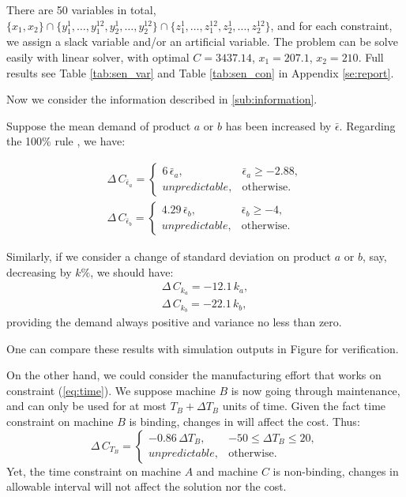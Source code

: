 \documentclass[a4paper,11pt]{article}
\begin{document}
There are 50 variables in total, $\big\{ x_1,x_2 \big\} \cap \big\{ y_1^1,\dots,y_1^{12},y_2^1,\dots,y_2^{12} \big\} \cap \big\{ z_1^1,\dots,z_1^{12},z_2^1,\dots,z_2^{12} \big\}$, and for each constraint, we assign a slack variable and/or an artificial variable. The problem can be solve easily with linear solver, with optimal $C=3437.14$, $x_1=207.1$, $x_2=210$. Full results see Table \ref{tab:sen_var} and Table \ref{tab:sen_con} in Appendix \ref{se:report}.

Now we consider the information described in \ref{sub:information}.

Suppose the mean demand of product $a$ or $b$ has been increased by $\bar{\epsilon}$. Regarding the 100\% rule \cite{BHM77}, we have:

\[
\begin{aligned}
    \Delta \, C_{\bar{\epsilon}_a} = 
    \begin{cases}
        6 \, \bar{\epsilon}_a, & \bar{\epsilon}_a \geq -2.88,\\
        unpredictable, & \text{otherwise}.
    \end{cases}\\
    \Delta \, C_{\bar{\epsilon}_b} = 
    \begin{cases}
        4.29 \, \bar{\epsilon}_b, & \bar{\epsilon}_b \geq -4,\\
        unpredictable, & \text{otherwise}.
    \end{cases}
\end{aligned}
\]

Similarly, if we consider a change of standard deviation on product $a$ or $b$, say, decreasing by $k\%$, we should have:
\[
\begin{aligned}
    \Delta \, C_{k_a} = -12.1 \, k_a,\\
    \Delta \, C_{k_b} = -22.1 \, k_b,
\end{aligned}
\]
providing the demand always positive and variance no less than zero.

One can compare these results with simulation outputs in Figure for verification.

On the other hand, we could consider the manufacturing effort that works on constraint (\ref{eq:time}). We suppose machine $B$ is now going through maintenance, and can only be used for at most $T_B + \Delta T_B$ units of time. Given the fact time constraint on machine $B$ is binding, changes in will affect the cost. Thus:
\[
    \Delta \, C_{T_B} = 
    \begin{cases}
        -0.86 \, \Delta T_B, & -50 \leq \Delta T_B \leq 20,\\
        unpredictable, & \text{otherwise}.
    \end{cases}
\]
Yet, the time constraint on machine $A$ and machine $C$ is non-binding, changes in allowable interval will not affect the solution nor the cost.
\end{document}
